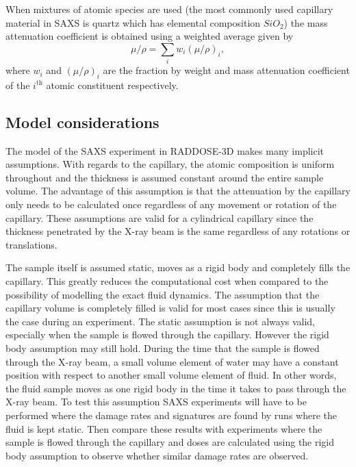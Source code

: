 When mixtures of atomic species are used (the most commonly used capillary material in SAXS is quartz which has elemental composition $SiO_2$) the mass attenuation coefficient is obtained using a weighted average given by
\begin{equation}
    \mu/\rho = \sum_i w_i (\mu/\rho)_i,
\end{equation}
where $w_i$ and $(\mu/\rho)_i$ are the fraction by weight and mass attenuation coefficient of the $i^{\text{th}}$ atomic constituent respectively.


\subsection{Model considerations}
\label{sub:Model considerations}
The model of the SAXS experiment in RADDOSE-3D makes many implicit assumptions.
With regards to the capillary, the atomic composition is uniform throughout and the thickness is assumed constant around the entire sample volume.
The advantage of this assumption is that the attenuation by the capillary only needs to be calculated once regardless of any movement or rotation of the capillary.
These assumptions are valid for a cylindrical capillary since the thickness penetrated by the X-ray beam is the same regardless of any rotations or translations.

The sample itself is assumed static, moves as a rigid body and completely fills the capillary.
This greatly reduces the computational cost when compared to the possibility of modelling the exact fluid dynamics.
The assumption that the capillary volume is completely filled is valid for most cases since this is usually the case during an experiment.
The static assumption is not always valid, especially when the sample is flowed through the capillary.
However the rigid body assumption may still hold.
During the time that the sample is flowed through the X-ray beam, a small volume element of water may have a constant position with respect to another small volume element of fluid.
In other words, the fluid sample moves as one rigid body in the time it takes to pass through the X-ray beam.
To test this assumption SAXS experiments will have to be performed where the damage rates and signatures are found by runs where the fluid is kept static.
Then compare these results with experiments where the sample is flowed through the capillary and doses are calculated using the rigid body assumption to observe whether similar damage rates are observed.


